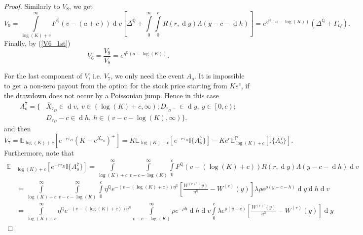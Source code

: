 \documentclass[10pt]{amsart}
\def\E{{\mathbb{E}}}
\def\P{{\mathbb{P}}}
\def\Q{{\mathbb{Q}}}
\def \R{{{\rm I{\!}\rm R}}}
\def \I{{\mathbb{I}}}
\newcommand{\dx}{\operatorname{d}\!}
\def\P{{\mathbb P}} \def\le{\left} \def\ri{\right} \def\i{\infty}
\def\E{{\mathbb E}} \def\PP{\mc P} \def\Z{{\mathbb Z}} \def\R{{\mathbb R}}
\begin{document}
\begin{proof}
			Similarly to $V_8$, we get
			\begin{equation*}
				V_9 = \int\limits_{\log(K)+c}^{\infty}F^\Q(v-(a+c))\dx v \left[ \Delta^\Q + \int\limits_{0}^{\infty}\int\limits_{0}^{c} R(r,\dx y) 	\Lambda(y-c-\dx h)  \right] = e^{\eta^\Q(a-\log(K))}(\Delta^\Q + \Gamma_Q).
			\end{equation*}	
			Finally, by (\ref{V6_1st})
			\begin{equation}
				V_6 = \frac{V_9}{V_8} = e^{\eta^\Q(a-\log(K))}.\label{V6}
			\end{equation}
			
			For the last component of $V$, i.e. $V_7$, we only need the event $A_o$. It is impossible to get a non-zero payout from the option for the stock price starting from $Ke^c$, if the drawdown does not occur by a Poissonian jump. Hence in this case
			\begin{align}\label{A7}
				A_o^7 = \{& \overline{X}_{\tau_D} \in \dx v,\ v \in (\log(K)+c, \infty); D_{\tau_D-} \in \dx y,\ y \in \left[ 0,c \right); \\ \nonumber & D_{\tau_D} - c \in \dx h,\ h \in (v-c-\log(K), \infty)
				\}.
			\end{align}
			and then
			\begin{equation*}
				V_7 = \E_{\log(K)+c}\left[ e^{-r\tau_D} \left( K - e^{X_{\tau_D}} \right)^+ \right] = K \E_{\log(K)+c}\left[ e^{-r\tau_D} \I \{ A_o^7 \} \right] - Ke^c \E^\P_{\log(K)+c}\left[ \I \{ A_o^7 \} \right].
			\end{equation*}
			Furthermore, note that		
			\begin{align*}
				\E&_{\log(K)+c}\left[ e^{-r\tau_D} \I \{ A_o^7 \} \right] = \int\limits_{\log(K)+c}^{\infty} \int\limits_{v-c-\log(K)}^{\infty}\int\limits_{0}^{c}F^\Q(v-(\log(K)+c))   R(r,\dx y) 	\Lambda(y-c-\dx h)   \dx v
				\\
				\nonumber&= \int\limits_{\log(K)+c}^{\infty} \int\limits_{v-c-\log(K)}^{\infty}\int\limits_{0}^{c} \eta^\Q e^{-( v - (\log(K)+c) )\eta^\Q} \left[ \frac{W^{(r)'}(y)}{\eta^{\Q}} - W^{(r)}(y) \right] \lambda\rho e^{\rho(y-c-h)} \dx y \dx h \dx v
				\\
				\nonumber&=  \int\limits_{\log(K)+c}^{\infty} \eta^\Q  e^{-( v - (\log(K)+c) )\eta^\Q} \int\limits_{v-c-\log(K)}^{\infty} \rho e^{ - \rho h} \dx h \dx v \int\limits_{0}^{c} \lambda e^{\rho(y-c)} \left[ \frac{W^{(r)'}(y)}{\eta^{\Q}} - W^{(r)}(y) \right] \dx y

\end{align*}
\end{proof}
\end{document}
